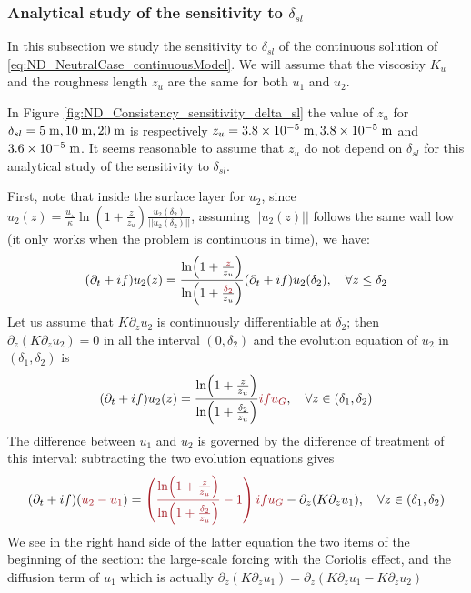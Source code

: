 \subsubsection{Analytical study of the sensitivity to $\delta_{sl}$}
\label{sec:ND_Consistency_sensitivity_delta_sl}
In this subsection we study the sensitivity to $\delta_{sl}$
of the continuous solution of
\eqref{eq:ND_NeutralCase_continuousModel}.
We will assume that the viscosity $K_u$ and the roughness length
$z_u$ are the same for both $u_1$ and $u_2$.
\par
In Figure \ref{fig:ND_Consistency_sensitivity_delta_sl} the value
of $z_u$ for $\delta_{sl} = 5\;{\rm m},10\;{\rm m},20\;{\rm m}$
is respectively $z_u = 3.8 \times 10^{-5} \;{\rm m},
3.8 \times 10^{-5} \;{\rm m}$ and $3.6 \times 10^{-5} \;{\rm m}$.
It seems reasonable to assume that $z_u$ do not depend on
$\delta_{sl}$ for this analytical study of the sensitivity to
$\delta_{sl}$.
\par
First, note that inside the surface layer for $u_2$,
since $u_2(z) = \frac{u_\star}{\kappa}\ln(1+\frac{z}{z_u})
\frac{u_2(\delta_{2})}{||u_2(\delta_{2})||}$, assuming
$||u_2(z)||$ follows the same wall low (it only works
when the problem is continuous in time), we have:
\begin{equation}
	(\partial_t + if) u_2(z) = \frac{\ln(1+\frac{\emphase{z}}{z_u})}
	{\ln(1+\frac{\emphase{\delta_2}}{z_u})}(\partial_t + if) u_2(\delta_2), 
~~~\forall z \leq \delta_2
\end{equation}
Let us assume that $K\partial_z u_2$ is
continuously differentiable at $\delta_2$;
then $\partial_z (K\partial_z u_2) = 0$ in all the interval
$(0, \delta_2)$ and the evolution equation of $u_2$ in
$(\delta_1, \delta_2)$ is
\begin{equation}
(\partial_t + if) u_2(z) = \frac{\ln(1+\frac{z}{z_u})}
	{\ln(1+\frac{\delta_2}{z_u})} \emphase{i f u_G}, 
	~~~\forall z \in (\delta_1, \delta_2)
\end{equation}
The difference between $u_1$ and $u_2$ is governed by
the difference of treatment of this interval:
subtracting the two evolution equations gives
\begin{equation}
	(\partial_t + if) (\emphase{u_2 - u_1}) =
	\emphase{\left(\frac{\ln(1+\frac{z}{z_u})}
	{\ln(1+\frac{\delta_2}{z_u})} - 1\right)i f u_G} 
-
\partial_z (K \partial_z u_1), ~~~\forall z \in (\delta_1, \delta_2)
\end{equation}
We see in the right hand side of the latter equation the two items
of the beginning of the section:
the large-scale forcing with the Coriolis effect,
and the diffusion term of $u_1$ which is actually
$\partial_z (K \partial_z u_1) = \partial_z (K \partial_z u_1 - K \partial_z u_2)$

